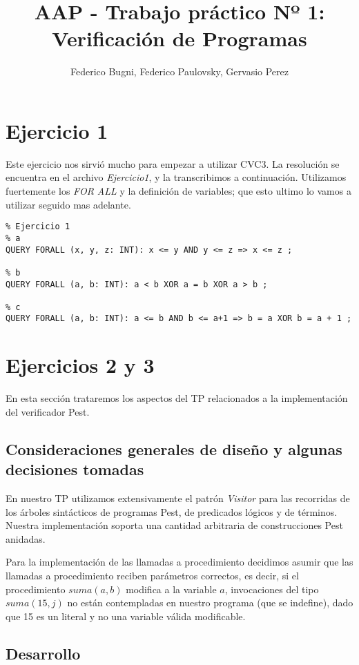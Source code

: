 \documentclass[a4paper]{article}
\author{Federico Bugni, Federico Paulovsky, Gervasio Perez}
\title{AAP - Trabajo práctico Nº 1: Verificación de Programas}
\begin{document}
\maketitle

\section{Ejercicio 1}

Este ejercicio nos sirvió mucho para empezar a utilizar CVC3. La resolución se encuentra en el archivo \textit{Ejercicio1}, y la transcribimos a continuación. Utilizamos fuertemente los \textit{FOR ALL} y la definición de variables; que esto ultimo lo vamos a utilizar seguido mas adelante.  

\begin{verbatim}
% Ejercicio 1
% a
QUERY FORALL (x, y, z: INT): x <= y AND y <= z => x <= z ;

% b
QUERY FORALL (a, b: INT): a < b XOR a = b XOR a > b ;

% c
QUERY FORALL (a, b: INT): a <= b AND b <= a+1 => b = a XOR b = a + 1 ;
\end{verbatim}

\section{Ejercicios 2 y 3}

En esta sección trataremos los aspectos del TP relacionados a la implementación del verificador Pest.

\subsection{Consideraciones generales de diseño y algunas decisiones tomadas}

En nuestro TP utilizamos extensivamente el patrón \textit{Visitor} para las recorridas de los árboles sintácticos de programas Pest, de predicados lógicos y de términos. Nuestra implementación soporta una cantidad arbitraria de construcciones Pest anidadas.

Para la implementación de las llamadas a procedimiento decidimos asumir que las llamadas a procedimiento reciben parámetros correctos, es decir, si el procedimiento $suma(a,b)$ modifica a la variable $a$, invocaciones del tipo $suma(15,j)$ no están contempladas en nuestro programa (que se indefine), dado que 15 es un literal y no una variable válida modificable.

\subsection{Desarrollo}
\end{document}
